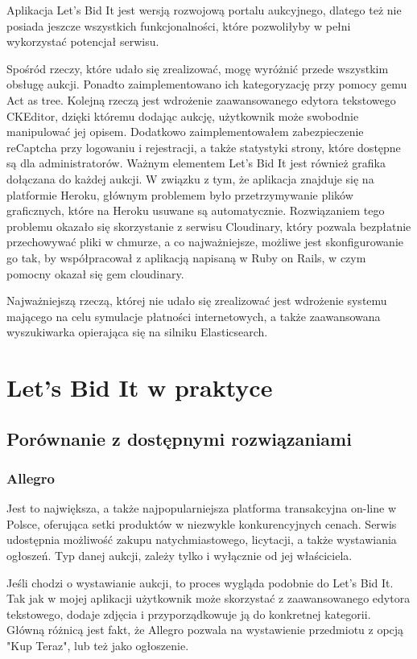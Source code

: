 \documentclass[brudnopis]{xmgr}
\begin{document}
Aplikacja Let's Bid It jest wersją rozwojową portalu aukcyjnego, dlatego też nie posiada jeszcze wszystkich funkcjonalności, które pozwoliłyby w pełni wykorzystać potencjał serwisu.

Spośród rzeczy, które udało się zrealizować, mogę wyróżnić przede wszystkim obsługę aukcji. Ponadto zaimplementowano ich kategoryzację przy pomocy gemu Act as tree. Kolejną rzeczą jest wdrożenie zaawansowanego edytora tekstowego CKEditor, dzięki któremu dodając aukcję, użytkownik może swobodnie manipulować jej opisem. Dodatkowo zaimplementowałem zabezpieczenie reCaptcha przy logowaniu i rejestracji, a także statystyki strony, które dostępne są dla administratorów. Ważnym elementem Let's Bid It jest również grafika dołączana do każdej aukcji. W związku z tym, że aplikacja znajduje się na platformie Heroku, głównym problemem było przetrzymywanie plików graficznych, które na Heroku usuwane są automatycznie. Rozwiązaniem tego problemu okazało się skorzystanie z serwisu Cloudinary, który pozwala bezpłatnie przechowywać pliki w chmurze, a co najważniejsze, możliwe jest skonfigurowanie go tak, by współpracował z aplikacją napisaną w Ruby on Rails, w czym pomocny okazał się gem cloudinary.

Najważniejszą rzeczą, której nie udało się zrealizować jest wdrożenie systemu mającego na celu symulacje płatności internetowych, a także zaawansowana wyszukiwarka opierająca się na silniku Elasticsearch.


\chapter{Let's Bid It w praktyce}

\section{Porównanie z dostępnymi rozwiązaniami}

\subsection{Allegro} 

Jest to największa, a także najpopularniejsza platforma transakcyjna on-line w Polsce, oferująca setki produktów w niezwykle konkurencyjnych cenach. Serwis udostępnia możliwość zakupu natychmiastowego, licytacji, a także wystawiania ogłoszeń. Typ danej aukcji, zależy tylko i wyłącznie od jej właściciela.

Jeśli chodzi o wystawianie aukcji, to proces wygląda podobnie do Let's Bid It. Tak jak w mojej aplikacji użytkownik może skorzystać z zaawansowanego edytora tekstowego, dodaje zdjęcia i przyporządkowuje ją do konkretnej kategorii. Główną różnicą jest fakt, że Allegro pozwala na wystawienie przedmiotu z opcją "Kup Teraz", lub też jako ogłoszenie.
\end{document}

